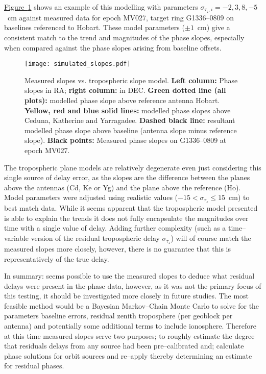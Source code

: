 		\hyperref[fig:troposplanecompare]{Figure~\ref*{fig:troposplanecompare}} shows an example of this modelling with parameters $\sigma_{\tau_z,i}=-2,3,8,-5$~cm against measured data for epoch MV027, target ring G1336--0809 on baselines referenced to Hobart. These model parameters ($\pm1$~cm) give a consistent match to the trend and magnitudes of the phase slopes, especially when compared against the phase slopes arising from baseline offsets. 
		
		
		\begin{figure}[h]
			\centering
			\texttt{[image: simulated\_slopes.pdf]}
			\caption[Measured slopes vs. model troposphere slopes]{Measured slopes vs. tropospheric slope model. \textbf{Left column:} Phase slopes in RA; \textbf{right column:} in DEC. \textbf{Green dotted line (all plots):} modelled phase slope above reference antenna Hobart. \textbf{ Yellow, red and blue solid lines:} modelled phase slopes above Ceduna, Katherine and Yarragadee. \textbf{Dashed black line:} resultant modelled phase slope above baseline (antenna slope minus reference slope). \textbf{Black points:} Measured phase slopes on G1336--0809 at epoch MV027.} \label{fig:troposplanecompare}
		\end{figure}
		The tropospheric plane models are relatively degenerate even just considering this single source of delay error, as the slopes are the difference between the planes above the antennas (Cd, Ke or Yg) and the plane above the reference (Ho). Model parameters were adjusted using realistic values ($-15<\sigma_{\tau_z}\le15$~cm) to best match data. While it seems apparent that the tropospheric model presented is able to explain the trends it does not fully encapsulate the magnitudes over time with a single value of delay. Adding further complexity (such as a time--variable version of the residual tropospheric delay $\sigma_{\tau_z}$) will of course match the measured slopes more closely, however, there is no guarantee that this is representatively of the true delay.
		
		In summary: seems possible to use the measured slopes to deduce what residual delays were present in the phase data, however, as it was not the primary focus of this testing, it should be investigated more closely in future studies. The most feasible method would be a Bayesian Markov--Chain Monte Carlo to solve for the parameters baseline errors, residual zenith troposphere (per geoblock per antenna) and potentially some additional terms to include ionosphere. Therefore at this time measured slopes serve two purposes; to roughly estimate the degree that residuals delays from any source had been pre--calibrated and; calculate phase solutions for orbit sources and re--apply thereby determining an estimate for residual phases.
		
